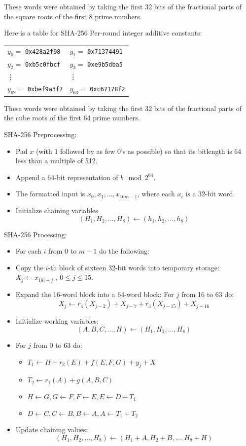 \documentclass[12pt,titlepage]{article}
\begin{document}
These words were obtained by taking the first 32 bits of the fractional parts of the square roots of the first 8 prime numbers.

Here is a table for SHA-256 Per-round integer additive constants:
\begin{center}
	\begin{tabular}{ll}
		$y_0 = $ \texttt{0x428a2f98}    & $y_1 = $ \texttt{0x71374491}    \\
		$y_2 = $ \texttt{0xb5c0fbcf}    & $y_3 = $ \texttt{0xe9b5dba5}    \\
		\vdots                          & \vdots                          \\
		$y_{62} = $ \texttt{0xbef9a3f7} & $y_{63} = $ \texttt{0xc67178f2} \\
	\end{tabular}
\end{center}
These words were obtained by taking the first 32 bits of the fractional parts of the cube roots of the first 64 prime numbers.

SHA-256 Preprocessing: \begin{itemize}
\item Pad $x$ (with 1 followed by as few 0’s as possible) so that its bitlength is 64 less than a multiple of 512.
\item Append a 64-bit representation of $b \mod 2^{64}$.
\item The formatted input is $x_0, x_1, ..., x_{16m-1}$, where each $x_i$ is a 32-bit word.
\item Initialize chaining variables $$(H_1, H_2, ..., H_8) \leftarrow (h_1, h_2, ..., h_8)$$
\end{itemize}

SHA-256 Processing: \begin{itemize}
\item For each $i$ from $0$ to $m - 1$ do the following: 
\item Copy the $i$-th block of sixteen 32-bit words into temporary storage: $X_j \leftarrow x_{16i+j}$ , $0 \leq j \leq 15$.
\item Expand the 16-word block into a 64-word block: For $j$ from 16 to 63 do: $$X_j \leftarrow r_4 (X_{j-2}) + X_{j-7} + r_3 (X_{j-15}) + X_{j-16}$$
\item Initialize working variables:$$(A, B, C, ..., H) \leftarrow (H_1, H_2, ..., H_8)$$
\item For $j$ from 0 to 63 do:\begin{itemize}
\item $T_1 \leftarrow H + r_2(E) + f(E, F, G) + y_j + X$
\item $T_2 \leftarrow r_1(A) + g(A, B, C)$
\item $H \leftarrow G, G \leftarrow F, F \leftarrow E, E \leftarrow D + T_1$
\item $D \leftarrow C, C \leftarrow B, B \leftarrow A, A \leftarrow T_1 + T_2$
\end{itemize}
\item Update chaining values: $$(H_1, H_2, ..., H_8) \leftarrow (H_1+A, H_2+B, ..., H_8+H)$$
\end{itemize}
\end{document}
